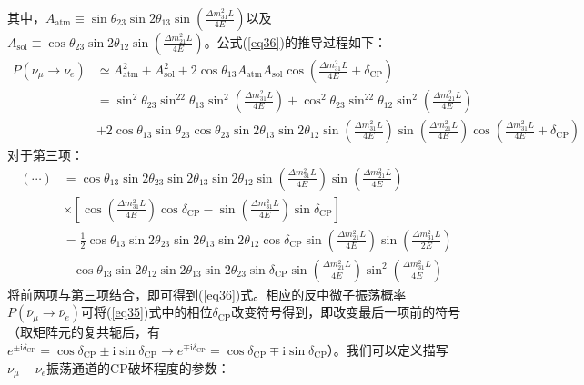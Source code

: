 \documentclass{article}
\newcommand{\ii}{\mathrm{i}}
\begin{document}
	其中，$A_\mathrm{atm}\equiv\sin\theta_{23}\sin2\theta_{13}\sin\left(\frac{\Delta m_{31}^2L}{4E}\right)$以及$A_\mathrm{sol}\equiv\cos\theta_{23}\sin2\theta_{12}\sin\left(\frac{\Delta m_{21}^2L}{4E}\right)$。公式(\ref{eq36})的推导过程如下：
	\begin{equation*}
		\begin{aligned}
			P(\nu_\mu\to\nu_e)&\simeq A_{\mathrm{atm}}^2+A_{\mathrm{sol}}^2+2\cos\theta_{13}A_{\mathrm{atm}}A_{\mathrm{sol}}\cos\left(\frac{\Delta m_{31}^2L}{4E}+\delta_{\mathrm{CP}}\right)\\
			&=\sin^2\theta_{23}\sin^22\theta_{13}\sin^2\left(\frac{\Delta m_{31}^2L}{4E}\right)+\cos^2\theta_{23}\sin^22\theta_{12}\sin^2\left(\frac{\Delta m_{21}^2L}{4E}\right)\\
			&+2\cos\theta_{13}\sin\theta_{23}\cos\theta_{23}\sin2\theta_{13}\sin2\theta_{12}\sin\left(\frac{\Delta m_{31}^2L}{4E}\right)\sin\left(\frac{\Delta m_{21}^2L}{4E}\right)\cos\left(\frac{\Delta m_{31}^2L}{4E}+\delta_{\mathrm{CP}}\right)
		\end{aligned}
	\end{equation*}
	对于第三项：
	\begin{equation*}
		\begin{aligned}
			(\cdots)&=\cos\theta_{13}\sin2\theta_{23}\sin2\theta_{13}\sin2\theta_{12}\sin\left(\frac{\Delta m_{31}^2L}{4E}\right)\sin\left(\frac{\Delta m_{21}^2L}{4E}\right)\\
			&\times\left[\cos\left(\frac{\Delta m_{31}^2L}{4E}\right)\cos\delta_\mathrm{CP}-\sin\left(\frac{\Delta m_{31}^2L}{4E}\right)\sin\delta_\mathrm{CP}\right]\\
			&=\frac{1}{2}\cos\theta_{13}\sin2\theta_{23}\sin2\theta_{13}\sin2\theta_{12}\cos\delta_\mathrm{CP}\sin\left(\frac{\Delta m_{21}^2L}{4E}\right)\sin\left(\frac{\Delta m_{31}^2L}{2E}\right)\\
			&-\cos\theta_{13}\sin2\theta_{12}\sin2\theta_{13}\sin2\theta_{23}\sin\delta_{\mathrm{CP}}\sin\left(\frac{\Delta m_{21}^2L}{4E}\right)\sin^2\left(\frac{\Delta m_{31}^2L}{4E}\right)
		\end{aligned}
	\end{equation*}
	将前两项与第三项结合，即可得到(\ref{eq36})式。相应的反中微子振荡概率$P(\bar\nu_\mu\to\bar\nu_e)$可将(\ref{eq35})式中的相位$\delta_\mathrm{CP}$改变符号得到，即改变最后一项前的符号（取矩阵元的复共轭后，有$e^{\pm\ii\delta_\mathrm{CP}}=\cos\delta_\mathrm{CP}\pm\ii\sin\delta_\mathrm{CP}\to e^{\mp\ii\delta_\mathrm{CP}}=\cos\delta_\mathrm{CP}\mp\ii\sin\delta_\mathrm{CP}$）。我们可以定义描写$\nu_\mu-\nu_e$振荡通道的CP破坏程度的参数：
\end{document}
